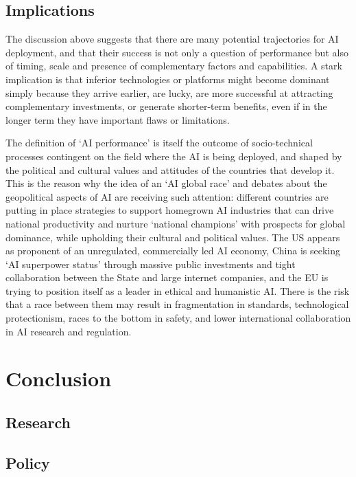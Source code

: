 \documentclass[11pt]{article}
\begin{document}
\subsection{Implications}
\label{subsec:races}
The discussion above suggests that there are many potential trajectories for AI deployment, and that their success is not only a question of performance but also of timing, scale and presence of complementary factors and capabilities. A stark implication is that inferior technologies or platforms might become dominant simply because they arrive earlier, are lucky, are more successful at attracting complementary investments, or generate shorter-term benefits, even if in the longer term they have important flaws or limitations.

The definition of `AI performance' is itself the outcome of socio-technical processes contingent on the field where the AI is being deployed, and shaped by the political and cultural values and attitudes of the countries that develop it. This is the reason why the idea of an `AI global race' and debates about the geopolitical aspects of AI are receiving such attention: different countries are putting in place strategies to support homegrown AI industries that can drive national productivity and nurture `national champions' with prospects for global dominance, while upholding their cultural and political values. The US appears as proponent of an unregulated, commercially led AI economy, China is seeking `AI superpower status' through massive public investments and tight collaboration between the State and large internet companies, and the EU is trying to position itself as a leader in ethical and humanistic AI. There is the risk that a race between them may result in fragmentation in standards, technological protectionism, races to the bottom in safety, and lower international collaboration in AI research and regulation. 

\section{Conclusion}
\label{subsec:conclusion}

\subsection{Research}
\label{subsec:research}

\subsection{Policy}
\label{subsec:policy}
\subsection{}







\singlespacing
\setlength\bibsep{0pt}


\end{document}
